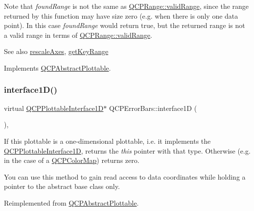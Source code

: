 Note that {\itshape found\+Range} is not the same as \hyperlink{class_q_c_p_range_ab38bd4841c77c7bb86c9eea0f142dcc0}{Q\+C\+P\+Range\+::valid\+Range}, since the range returned by this function may have size zero (e.\+g. when there is only one data point). In this case {\itshape found\+Range} would return true, but the returned range is not a valid range in terms of \hyperlink{class_q_c_p_range_ab38bd4841c77c7bb86c9eea0f142dcc0}{Q\+C\+P\+Range\+::valid\+Range}.

\begin{DoxySeeAlso}{See also}
\hyperlink{class_q_c_p_abstract_plottable_a1491c4a606bccd2d09e65e11b79eb882}{rescale\+Axes}, \hyperlink{class_q_c_p_error_bars_a6cac828a430d66ac77a167549d01d212}{get\+Key\+Range} 
\end{DoxySeeAlso}


Implements \hyperlink{class_q_c_p_abstract_plottable_a4de773988b21ed090fddd27c6a3a3dcb}{Q\+C\+P\+Abstract\+Plottable}.

\mbox{\label{class_q_c_p_error_bars_a0b6fbf3a943b4241ee485d066cc8562a}} 
\subsubsection{\texorpdfstring{interface1\+D()}{interface1D()}}
{\footnotesize\ttfamily virtual \hyperlink{class_q_c_p_plottable_interface1_d}{Q\+C\+P\+Plottable\+Interface1D}$\ast$ Q\+C\+P\+Error\+Bars\+::interface1D (\begin{DoxyParamCaption}{ }\end{DoxyParamCaption})\hspace{0.3cm}{\ttfamily [inline]}, {\ttfamily [virtual]}}

If this plottable is a one-\/dimensional plottable, i.\+e. it implements the \hyperlink{class_q_c_p_plottable_interface1_d}{Q\+C\+P\+Plottable\+Interface1D}, returns the {\itshape this} pointer with that type. Otherwise (e.\+g. in the case of a \hyperlink{class_q_c_p_color_map}{Q\+C\+P\+Color\+Map}) returns zero.

You can use this method to gain read access to data coordinates while holding a pointer to the abstract base class only. 

Reimplemented from \hyperlink{class_q_c_p_abstract_plottable_a81fd9fd5c4f429c074785e2eb238a8e7}{Q\+C\+P\+Abstract\+Plottable}.

